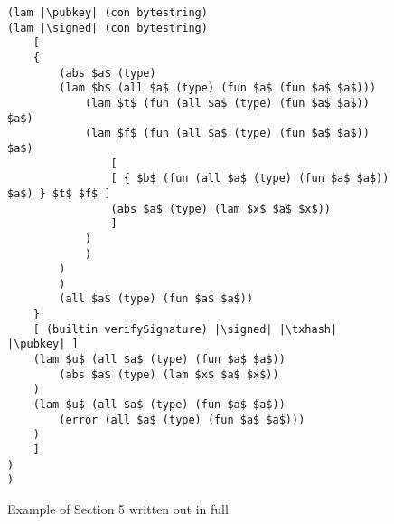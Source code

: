 \documentclass[../plutus-core-specification.tex]{subfiles}
\begin{document}
\begin{figure*}[h]  %
\begin{lstlisting}
(lam |\pubkey| (con bytestring)
(lam |\signed| (con bytestring)
    [
    {
        (abs $a$ (type)
        (lam $b$ (all $a$ (type) (fun $a$ (fun $a$ $a$)))
            (lam $t$ (fun (all $a$ (type) (fun $a$ $a$)) $a$)
            (lam $f$ (fun (all $a$ (type) (fun $a$ $a$)) $a$)
                [
                [ { $b$ (fun (all $a$ (type) (fun $a$ $a$)) $a$) } $t$ $f$ ]
                (abs $a$ (type) (lam $x$ $a$ $x$))
                ]
            )
            )
        )
        )
        (all $a$ (type) (fun $a$ $a$))
    }
    [ (builtin verifySignature) |\signed| |\txhash| |\pubkey| ]
    (lam $u$ (all $a$ (type) (fun $a$ $a$))
        (abs $a$ (type) (lam $x$ $a$ $x$))
    )
    (lam $u$ (all $a$ (type) (fun $a$ $a$))
        (error (all $a$ (type) (fun $a$ $a$)))
    )
    ]
)
)
\end{lstlisting}
\caption{Example of Section 5 written out in full}
\label{fig:Continuized_Let_Example}
\end{figure*}
\end{document}
